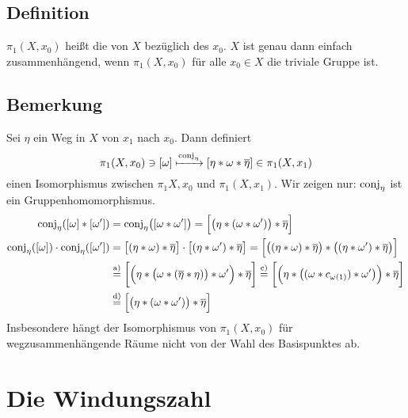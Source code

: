 \subsection[Definition: Fundamentalgruppe]{Definition} %
\label{sub:910}
$\pi_1(X, x_0)$ heißt die  von $X$ bezüglich des  $x_0$.
$X$ ist genau dann einfach zusammenhängend, wenn $\pi_1(X,x_0)$ für alle $x_0 \in X$ die triviale Gruppe ist.

\subsection[Bemerkung: Isomorphie zwischen Fundamentalgruppen]{Bemerkung} %
\label{sub:911}
Sei $\eta$ ein Weg in $X$ von $x_1$ nach $x_0$. Dann definiert
\[
	\pi_1(X,x_0) \ni [\omega] \xmapsto{\conj_\eta} \benbrace*{\eta * \omega * \overline{\eta}}  \in \pi_1(X,x_1)
\]
einen Isomorphismus zwischen $\pi_1{X,x_0}$ und $\pi_1(X,x_1)$. Wir zeigen nur: $\conj_\eta$ ist ein Gruppenhomomorphismus.
\begin{align*}
	\conj_\eta \enbrace*{ \benbrace*{\omega} * \benbrace*{\omega'}} &= \conj_\eta \enbrace[\big]{ \benbrace*{\omega * \omega'}} = \benbrace[\Big]{ \enbrace[\big]{\eta * (\omega * \omega')} * \overline{\eta}  }  \\
	\conj_\eta \enbrace*{[\omega]} \cdot \conj_\eta \enbrace*{[\omega']} &= \benbrace[\big]{(\eta * \omega) * \overline{\eta} } \cdot  \benbrace[\big]{(\eta * \omega') * \overline{\eta}} = \benbrace[\Big]{ \enbrace[\big]{ \enbrace*{\eta * \omega}* \overline{\eta}  } * \enbrace[\big]{\enbrace*{\eta * \omega'} * \overline{\eta}  }  } \\
	&\stackrel{\text{a)}}{=} \benbrace[\bigg]{ \enbrace[\Big]{\eta * \enbrace[\big]{\omega * \enbrace*{\overline{\eta} * \eta } }* \omega' } * \overline{\eta}  } 
	\stackrel{\text{c)}}{=} \benbrace[\bigg]{\enbrace[\Big]{ \eta * \enbrace[\big]{\enbrace{\omega * c_{\omega(1)}} * \omega' } } * \overline{\eta}} \\
	&\stackrel{\text{d)}}{=}
	\benbrace[\Big]{\enbrace[\big]{\eta * \enbrace*{\omega * \omega'} } * \overline{\eta}  } 
\end{align*}
Insbesondere hängt der Isomorphismus von $\pi_1(X,x_0)$ für wegzusammenhängende Räume nicht von der Wahl des Basispunktes ab.
\newpage

\section{Die Windungszahl} %
\label{sec:10}
